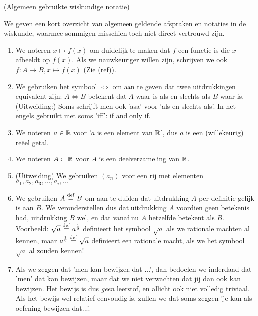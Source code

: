 \documentclass{ximera}
\begin{document}
\begin{notation} (Algemeen gebruikte wiskundige notatie) 
	
	We geven een kort overzicht van algemeen geldende afspraken en notaties in de wiskunde, waarmee sommigen misschien toch niet direct vertrouwd zijn.
	\begin{enumerate}
		\item We noteren $x\mapsto f(x)$ om duidelijk te maken dat $f$ een functie is die $x$ afbeeldt op $f(x)$. Als we nauwkeuriger willen zijn, schrijven we ook $f:A\to B, x\mapsto f(x)$ (Zie (ref)).
		\item We gebruiken het symbool $\iff$ om aan te geven dat twee uitdrukkingen equivalent zijn: $A \iff B$ betekent dat $A$ waar is als en slechts als $B$ waar is. (Uitweiding:) Soms schrijft men ook 'asa' voor 'als en slechts als'. In het engels gebruikt met soms 'iff': if and only if.
		\item We noteren $a\in\mathbb{R}$ voor '$a$ is een element van $\mathbb{R}$', dus $a$ is een (willekeurig) reëel getal.
		\item We noteren $A\subset \mathbb{R}$ voor $A$ is een deelverzameling van $\mathbb{R}$.
		\item (Uitweiding) We gebruiken $(a_n)$ voor een rij met elementen $a_1,a_2,a_3,\dots,a_i,\dots$ 
		\item We gebruiken $A\overset{\mathrm{def}}{=} B$ om aan te duiden dat uitdrukking $A$ per definitie gelijk is aan $B$. We veronderstellen dus dat uitdrukking $A$ voordien geen betekenis had, uitdrukking $B$ wel, en dat vanaf nu $A$ hetzelfde betekent als $B$. Voorbeeld: $\sqrt{a}\overset{\mathrm{def}}{=} a^{\frac12}$ definieert het symbool $\sqrt{a}$ als we rationale machten al kennen, maar $a^{\frac12} \overset{\mathrm{def}}{=} \sqrt{a}$ definieert een rationale macht, als we het symbool $\sqrt{a}$ al zouden kennen!
		\item Als we zeggen dat 'men kan bewijzen dat ...', dan bedoelen we inderdaad dat 'men' dat kan bewijzen, maar dat we niet verwachten dat jij dan ook kan bewijzen. Het bewijs is dus \textit{geen} leerstof, en allicht ook niet volledig triviaal. 
		Als het bewijs wel relatief eenvoudig is, zullen we dat soms zeggen 'je kan als oefening bewijzen dat...'.
	\end{enumerate}
\end{notation}
\end{document}
